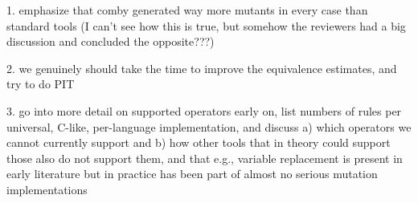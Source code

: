 1. emphasize that comby generated way more mutants in every case than standard tools (I can't see how this is true, but somehow the reviewers had a big discussion and concluded the opposite???)

2.  we genuinely should take the time to improve the equivalence estimates, and try to do PIT

3.  go into more detail on supported operators early on, list numbers of rules per universal, C-like, per-language implementation, and discuss a) which operators we cannot currently support and b) how other tools that in theory could support those also do not support them, and that e.g., variable replacement is present in early literature but in practice has been part of almost no serious mutation implementations